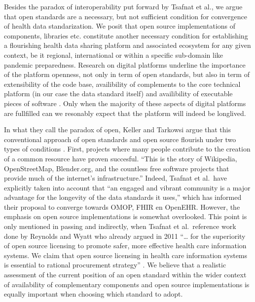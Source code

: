\documentclass[
  authoryear]{elsarticle}
\begin{document}
Besides the paradox of interoperability put forward by Tsafnat et al.,
we argue that open standards are a necessary, but not sufficient
condition for convergence of health data standarization. We posit that
open source implementations of components, libraries etc. constitute
another necessary condition for establishing a flourishing health data
sharing platform and associated ecosystem for any given context, be it
regional, international or within a specific sub-domain like pandemic
preparedness. Research on digital platforms underline the importance of
the platform openness, not only in term of open standards, but also in
term of extensibility of the code base, availibility of complements to
the core technical platform (in our case the data standard itself) and
availibility of executable pieces of software
\citep{dereuver2018digital}. Only when the majority of these aspects of
digital platforms are fullfilled can we resonably expect that the
platform will indeed be longlived.

In what they call the paradox of open, Keller and Tarkowsi argue that
this conventional approach of open standards and open source flourish
under two types of conditions \citep{keller2021paradox}. First, projects
where many people contribute to the creation of a common resource have
proven succesful. ``This is the story of Wikipedia, OpenStreetMap,
Blender.org, and the countless free software projects that provide much
of the internet's infrastructure.'' \citep{keller2021paradox} Indeed,
Tsafnat et al.~have explicitly taken into account that ``an engaged and
vibrant community is a major advantage for the longevity of the data
standards it uses,'' which has informed their proposal to converge
towards OMOP, FHIR en OpenEHR. However, the emphasis on open source
implementations is somewhat overlooked. This point is only mentioned in
passing and indirectly, when Tsafnat et al.~reference work done by
Reynolds and Wyatt who already argued in 2011 ``\ldots{} for the
superiority of open source licensing to promote safer, more effective
health care information systems. We claim that open source licensing in
health care information systems is essential to rational procurement
strategy'' \citep{reynolds2011open}. We believe that a realistic
assessment of the current position of an open standard within the wider
context of availability of complementary components and open source
implementations is equally important when choosing which standard to
adopt.
\end{document}
